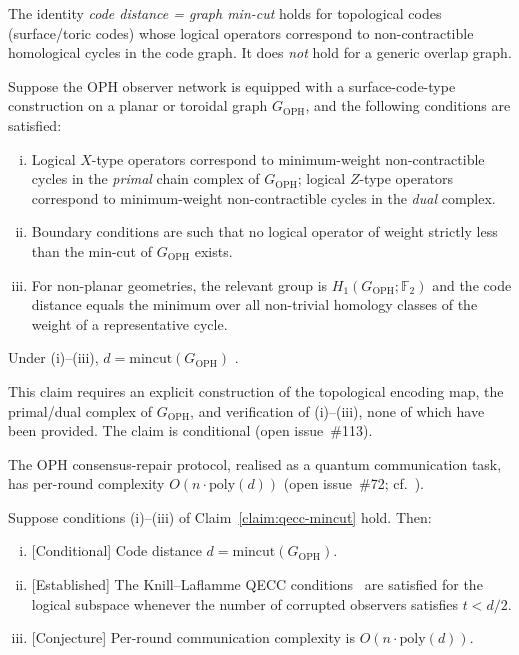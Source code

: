 \begin{claim}
\label{claim:qecc-mincut}
The identity \emph{code distance = graph min-cut} holds for topological
codes (surface/toric codes) whose logical operators correspond to
non-contractible homological cycles in the code graph.
It does \emph{not} hold for a generic overlap graph.

Suppose the OPH observer network is equipped with a surface-code-type
construction on a planar or toroidal graph $G_{\mathrm{OPH}}$, and the
following conditions are satisfied:
\begin{enumerate}[(i)]
  \item Logical $X$-type operators correspond to minimum-weight
        non-contractible cycles in the \emph{primal} chain complex of
        $G_{\mathrm{OPH}}$; logical $Z$-type operators correspond to
        minimum-weight non-contractible cycles in the \emph{dual} complex.
  \item Boundary conditions are such that no logical operator of weight
        strictly less than the min-cut of $G_{\mathrm{OPH}}$ exists.
  \item For non-planar geometries, the relevant group is
        $H_1(G_{\mathrm{OPH}};\mathbb{F}_2)$ and the code distance equals
        the minimum over all non-trivial homology classes of the weight of
        a representative cycle.
\end{enumerate}
Under (i)--(iii), $d=\mathrm{mincut}(G_{\mathrm{OPH}})$
\cite{Kitaev2003,Dennis2002}.

This claim requires an explicit construction of the topological encoding
map, the primal/dual complex of $G_{\mathrm{OPH}}$, and verification of
(i)--(iii), none of which have been provided.
The claim is conditional (open issue~\#113).
\end{claim}

\begin{conjecture}
\label{conj:comm-complexity}
The \textrm{OPH} consensus-repair protocol, realised as a quantum
communication task, has per-round complexity $O(n\cdot\mathrm{poly}(d))$
(open issue~\#72; cf.~\cite{BCW98}).
\end{conjecture}

\begin{theorem}
\label{thm:qecc}
Suppose conditions (i)--(iii) of Claim~\ref{claim:qecc-mincut} hold.
Then:
\begin{enumerate}[(i)]
  \item \textrm{[Conditional]} Code distance $d =
        \mathrm{mincut}(G_{\mathrm{OPH}})$.
  \item \textrm{[Established]} The Knill--Laflamme \textrm{QECC}
        conditions~\cite{KL97} are satisfied for the logical subspace
        whenever the number of corrupted observers satisfies $t<d/2$.
  \item \textrm{[Conjecture]} Per-round communication complexity is
        $O(n\cdot\mathrm{poly}(d))$.
\end{enumerate}
\end{theorem}

